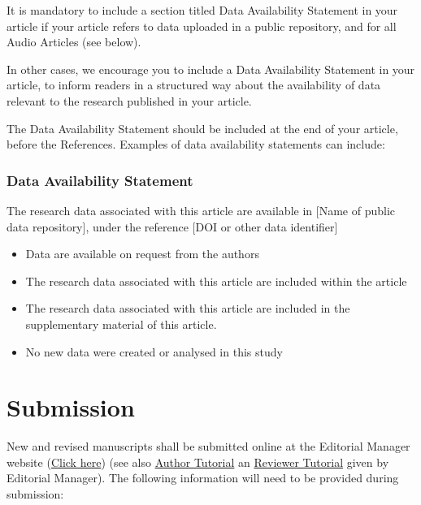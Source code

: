 It is mandatory to include a section titled Data Availability Statement
in your article if your article refers to data uploaded in a public
repository, and for all Audio Articles (see below).

In other cases, we encourage you to include a Data Availability Statement
in your article, to inform readers in a structured way about the availability
of data relevant to the research published in your article.

The Data Availability Statement should be included at the end of your
article, before the References. Examples of data availability statements
can include:

\subsubsection*{Data Availability Statement}

The research data associated with this article are available in {[}Name
of public data repository{]}, under the reference {[}DOI or other
data identifier{]} 
\begin{itemize}
\item Data are available on request from the authors 
\item The research data associated with this article are included within
the article 
\item The research data associated with this article are included in the
supplementary material of this article. 
\item No new data were created or analysed in this study 
\end{itemize}

\section{Submission }

New and revised manuscripts shall be submitted online at the Editorial
Manager website (\href{http://www.editorialmanager.com/aacus}{Click here})
(see also \href{http://www.ariessys.com/wp-content/uploads/EM-Author-English.pdf}{Author Tutorial}
an \href{http://www.ariessys.com/wp-content/uploads/EM-Reviewer-English.pdf}{Reviewer Tutorial}
given by Editorial Manager). The following information will need to
be provided during submission:

